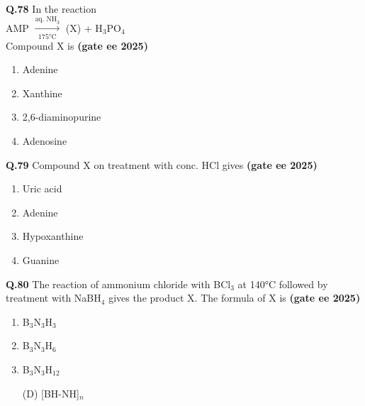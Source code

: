 \documentclass[journal,12pt,onecolumn]{exam}
\theoremstyle{remark}
\begin{document}
 \noindent \textbf{Q.78} In the reaction\\
\hspace*{1cm} AMP \hspace{0.5cm} $\xrightarrow[\text{175°C}]{\text{aq. NH}_3}$ \hspace{0.5cm} (X) + H$_3$PO$_4$\\
Compound X is \hfill{\textbf{(gate ee 2025)}}
\begin{multicols}{2}
\begin{enumerate}[label=(\Alph*)]
    \item Adenine
    \item Xanthine
    \item 2,6-diaminopurine
    \item Adenosine
\end{enumerate}
\end{multicols}
\vspace{0.5cm}

\noindent \textbf{Q.79} Compound X on treatment with conc. HCl gives \hfill{\textbf{(gate ee 2025)}}
\begin{multicols}{2}
\begin{enumerate}[label=(\Alph*)]
    \item Uric acid
    \item Adenine
    \item Hypoxanthine
    \item Guanine
\end{enumerate}
\end{multicols}
\vspace{0.5cm}

\noindent \textbf{Q.80} The reaction of ammonium chloride with BCl$_3$ at 140°C followed by treatment with NaBH$_4$ gives the product X. The formula of X is \hfill{\textbf{(gate ee 2025)}}
\begin{multicols}{2}
\begin{enumerate}[label=(\Alph*)]
    \item B$_3$N$_3$H$_3$
    \item B$_3$N$_3$H$_6$
    \item B$_3$N$_3$H$_{12}$
    \item[(D)] [BH-NH]$_n$
\end{enumerate}
\end{multicols}
\vspace{2cm}
\end{document}
